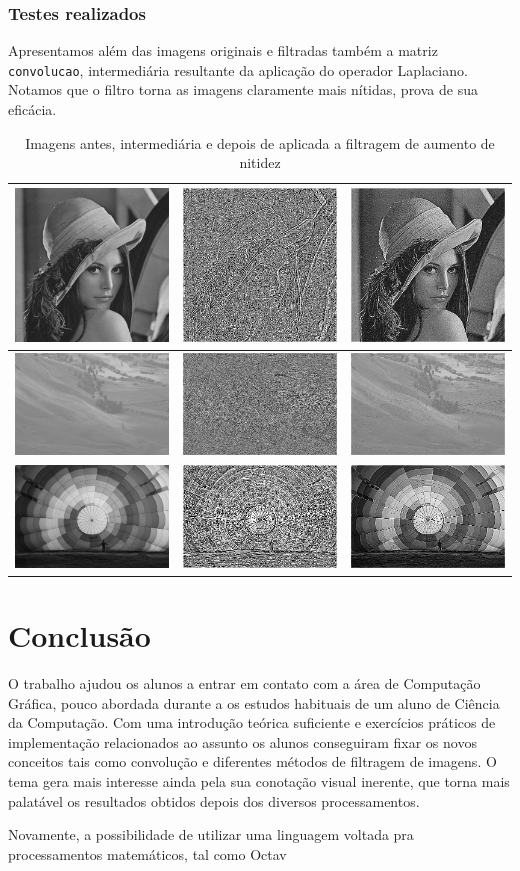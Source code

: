 \documentclass[brazil,times]{abnt}
\begin{document}
		\subsection{Testes realizados}
			Apresentamos além das imagens originais e filtradas também a matriz \texttt{convolucao}, intermediária resultante da aplicação do operador Laplaciano. Notamos que o filtro torna as imagens claramente mais nítidas, prova de sua eficácia.
			\begin{table}[ht]
			\caption{Imagens antes, intermediária e depois de aplicada a filtragem de aumento de nitidez}
			\centering
			\begin{tabular}{|c|c|c|}
			\hline
			\includegraphics[scale=0.27]{imagens/lena.jpg}&\includegraphics[scale=0.27]{imagens/lena-convolucao.jpg}&\includegraphics[scale=0.27]{imagens/lena-sharpen.jpg}\\
			\hline
			\includegraphics[scale=0.135]{imagens/hawkes.jpg}&\includegraphics[scale=0.135]{imagens/hawkes-convolucao.jpg}&\includegraphics[scale=0.135]{imagens/hawkes-sharpen.jpg}\\
			\hline
			\includegraphics[scale=0.27]{imagens/baloon.JPG}&\includegraphics[scale=0.27]{imagens/baloon-convolucao.jpg}&\includegraphics[scale=0.27]{imagens/baloon-sharpen.jpg}\\
			\hline
			\end{tabular}
			\label{tab:gt}
			\end{table}



\chapter{Conclusão}
	O trabalho ajudou os alunos a entrar em contato com a área de Computação Gráfica, pouco abordada durante a os estudos habituais de um aluno de Ciência da Computação. Com uma introdução teórica suficiente e exercícios práticos de implementação relacionados ao assunto os alunos conseguiram fixar os novos conceitos tais como convolução e diferentes métodos de filtragem de imagens. O tema gera mais interesse ainda pela sua conotação visual inerente, que torna mais palatável os resultados obtidos depois dos diversos processamentos.
	
	Novamente, a possibilidade de utilizar uma linguagem voltada pra processamentos matemáticos, tal como Octav
\end{document}
